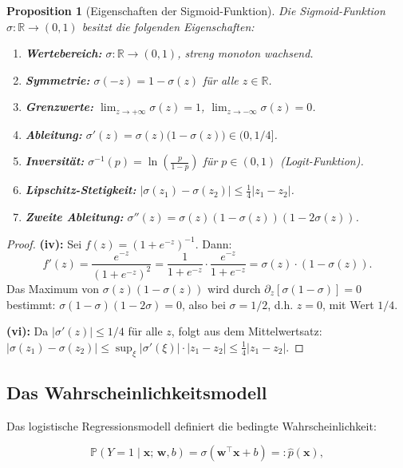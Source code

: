 ﻿\documentclass[12pt, a4paper]{article}
\newtheorem{proposition}[theorem]{Proposition}
\theoremstyle{definition}
\theoremstyle{remark}
\newcommand{\R}{\mathbb{R}}
\newcommand{\Prob}{\mathbb{P}}
\newcommand{\sigmoid}{\sigma}
\newcommand{\vw}{\bm{w}}
\newcommand{\vx}{\bm{x}}
\newcommand{\T}{\top}
\begin{document}
\begin{proposition}[Eigenschaften der Sigmoid-Funktion]
  \label{prop:sigmoid_properties}
  Die Sigmoid-Funktion $\sigmoid: \R \to (0,1)$ besitzt die folgenden Eigenschaften:
  \begin{enumerate}[label=(\roman*)]
    \item \textbf{Wertebereich:} $\sigmoid : \R \to (0,1)$, streng monoton wachsend.
    \item \textbf{Symmetrie:} $\sigmoid(-z) = 1 - \sigmoid(z)$ für alle $z \in \R$.
    \item \textbf{Grenzwerte:} $\lim_{z\to+\infty}\sigmoid(z) = 1$, $\lim_{z\to-\infty}\sigmoid(z) = 0$.
    \item \textbf{Ableitung:} $\sigmoid'(z) = \sigmoid(z)\bigl(1 - \sigmoid(z)\bigr) \in (0, 1/4]$.
    \item \textbf{Inversität:} $\sigmoid^{-1}(p) = \ln\!\left(\frac{p}{1-p}\right)$ für $p \in (0,1)$ (Logit-Funktion).
    \item \textbf{Lipschitz-Stetigkeit:} $|\sigmoid(z_1) - \sigmoid(z_2)| \leq \frac{1}{4}|z_1 - z_2|$.
    \item \textbf{Zweite Ableitung:} $\sigmoid''(z) = \sigmoid(z)(1-\sigmoid(z))(1-2\sigmoid(z))$.
  \end{enumerate}
\end{proposition}

\begin{proof}
  \textbf{(iv):} Sei $f(z) = (1+e^{-z})^{-1}$. Dann:
  \[
    f'(z) = \frac{e^{-z}}{(1+e^{-z})^2}
           = \frac{1}{1+e^{-z}} \cdot \frac{e^{-z}}{1+e^{-z}}
           = \sigmoid(z) \cdot (1-\sigmoid(z)).
  \]
  Das Maximum von $\sigmoid(z)(1-\sigmoid(z))$ wird durch $\partial_z[\sigmoid(1-\sigmoid)]=0$ bestimmt:
  $\sigmoid(1-\sigmoid)(1-2\sigmoid)=0$, also bei $\sigmoid=1/2$, d.h. $z=0$, mit Wert $1/4$.

  \textbf{(vi):} Da $|\sigmoid'(z)| \leq 1/4$ für alle $z$, folgt aus dem Mittelwertsatz:
  $|\sigmoid(z_1)-\sigmoid(z_2)| \leq \sup_\xi |\sigmoid'(\xi)| \cdot |z_1-z_2| \leq \frac{1}{4}|z_1-z_2|$. 
\end{proof}

\subsection{Das Wahrscheinlichkeitsmodell}

Das logistische Regressionsmodell definiert die bedingte Wahrscheinlichkeit:

\begin{equation}
  \Prob(Y = 1 \mid \vx;\, \vw, b) = \sigmoid(\vw^\T\vx + b) =: \hat{p}(\vx),
  \label{eq:prob_model}
\end{equation}
\end{document}
